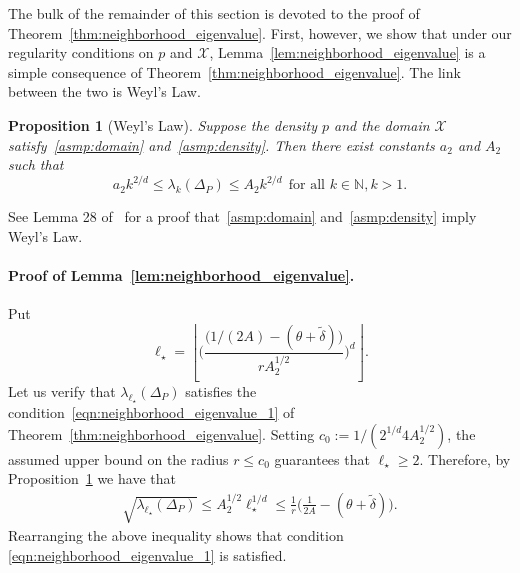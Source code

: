 \documentclass[twoside]{article}
\newcommand{\floor}[1]{\left\lfloor #1 \right\rfloor}
\newcommand{\1}{\mathbf{1}}
\newcommand{\Xset}{\mathcal{X}}
\newcommand{\wt}[1]{\widetilde{#1}}
\newtheorem{proposition}{Proposition}
\theoremstyle{definition}
\theoremstyle{remark}
\begin{document}
The bulk of the remainder of this section is devoted to the proof of Theorem~\ref{thm:neighborhood_eigenvalue}. First, however, we show that under our regularity conditions on $p$ and $\Xset$, Lemma~\ref{lem:neighborhood_eigenvalue} is a simple consequence of Theorem~\ref{thm:neighborhood_eigenvalue}. The link between the two is Weyl's Law.
\begin{proposition}[Weyl's Law]
	\label{prop:weyl}
	Suppose the density $p$ and the domain $\Xset$ satisfy~\ref{asmp:domain} and~\ref{asmp:density}. Then there exist constants $a_2$ and $A_2$ such that
	\begin{equation}
	\label{eqn:weyls_law}
	a_2k^{2/d} \leq \lambda_k(\Delta_P) \leq A_2k^{2/d}~~\textrm{for all $k \in \mathbb{N}, k > 1$}.
	\end{equation}
\end{proposition}
See Lemma 28 of~\citet{dunlop2020} for a proof that~\ref{asmp:domain} and~\ref{asmp:density} imply Weyl's Law.

\paragraph{Proof of Lemma~\ref{lem:neighborhood_eigenvalue}.}
Put
\begin{equation*}
\ell_{\star} = \floor{\biggl(\frac{\bigl(1/(2A) - (\theta + \wt{\delta})\bigr)}{rA_2^{1/2}}\biggr)^d}.
\end{equation*}
Let us verify that $\lambda_{\ell_{\star}}(\Delta_P)$ satisfies the condition~\eqref{eqn:neighborhood_eigenvalue_1} of Theorem~\ref{thm:neighborhood_eigenvalue}. Setting $c_0 := 1/(2^{1/d}4A_2^{1/2})$, the assumed upper bound on the radius $r \leq c_0$ guarantees that $\ell_{\star} \geq 2$. Therefore, by Proposition~\ref{prop:weyl} we have that
\begin{align*}
\sqrt{\lambda_{\ell_{\star}}(\Delta_P)} \leq A_2^{1/2}\ell_{\star}^{1/d} \leq  \frac{1}{r}\biggl(\frac{1}{2A} - (\theta + \wt{\delta})\biggr).
\end{align*}
Rearranging the above inequality shows that condition \eqref{eqn:neighborhood_eigenvalue_1} is satisfied. 
\end{document}
